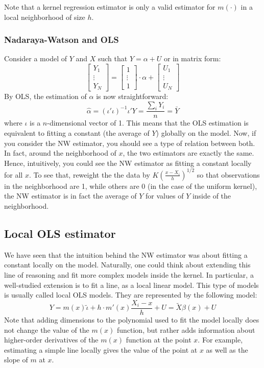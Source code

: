 \documentclass[12pt]{report}
\begin{document}
Note that a kernel regression estimator is only a valid estimator for $m(\cdot)$ in a local neighborhood of size $h$.

\subsubsection{Nadaraya-Watson and OLS}

Consider a model of $Y$ and $X$ such that $Y = \alpha + U$ or in matrix form: $$\begin{bmatrix}
Y_1 \\ \vdots \\ Y_N
\end{bmatrix} = \begin{bmatrix}
1 \\ \vdots \\ 1
\end{bmatrix}\cdot \alpha + \begin{bmatrix}
U_1 \\ \vdots \\ U_N
\end{bmatrix} $$ By OLS, the estimation of $\alpha$ is now straightforward: $$\hat\alpha = (\iota' \iota)^{-1} \iota' Y = \frac{\sum_i Y_i}{n} = \bar Y$$ where $\iota$ is a $n$-dimensional vector of 1. This means that the OLS estimation is equivalent to fitting a constant (the average of $Y$) globally on the model. Now, if you consider the NW estimator, you should see a type of relation between both. In fact, around the neighborhood of $x$, the two estimators are exactly the same. Hence, intuitively, you could see the NW estimator as fitting a constant locally for all $x$. To see that, reweight the the data by $K\left(\frac{x - X_i}{h}\right)^{1/2}$ so that observations in the neighborhood are 1, while others are 0 (in the case of the uniform kernel), the NW estimator is in fact the average of $Y$ for values of $Y$ inside of the neighborhood.

\subsection{Local OLS estimator}

We have seen that the intuition behind the NW estimator was about fitting a constant locally on the model. Naturally, one could think about extending this line of reasoning and fit more complex models inside the kernel. In particular, a well-studied extension is to fit a line, as a local linear model. This type of models is usually called local OLS models. They are represented by the following model: $$Y = m(x)\tilde\iota + h\cdot m'(x)\frac{X_i - x}{h} + U = \tilde X\beta (x) + U $$ Note that adding dimensions to the polynomial used to fit the model locally does not change the value of the $m(x)$ function, but rather adds information about higher-order derivatives of the $m(x)$ function at the point $x$. For example, estimating a simple line locally gives the value of the point at $x$ as well as the slope of $m$ at $x$.
\end{document}
